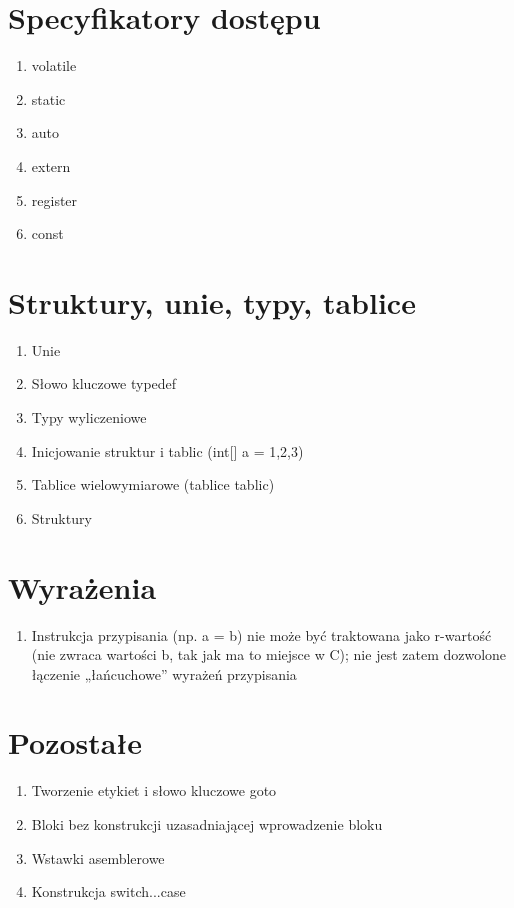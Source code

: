 \documentclass[a4paper,twoside,openright,11pt]{report}
\begin{document}
  \section {Specyfikatory dostępu}
    \begin{enumerate}
      \item volatile
      \item static
      \item auto
      \item extern
      \item register
      \item const
    \end{enumerate}
  \section {Struktury, unie, typy, tablice}
    \begin{enumerate}
      \item Unie
      \item Słowo kluczowe typedef
      \item Typy wyliczeniowe
      \item Inicjowanie struktur i tablic (int[] a = {1,2,3})
      \item Tablice wielowymiarowe (tablice tablic) 
      \item Struktury
    \end{enumerate}
  \section {Wyrażenia}
    \begin{enumerate}
      \item Instrukcja przypisania (np. a = b) nie może być traktowana jako r-wartość (nie zwraca wartości b, tak jak ma to miejsce w C); nie jest zatem dozwolone łączenie „łańcuchowe” wyrażeń przypisania
    \end{enumerate}
  \section {Pozostałe}
    \begin{enumerate}
      \item Tworzenie etykiet i słowo kluczowe goto
      \item Bloki bez konstrukcji uzasadniającej wprowadzenie bloku
      \item Wstawki asemblerowe
      \item Konstrukcja switch...case
    \end{enumerate}
\end{document}
